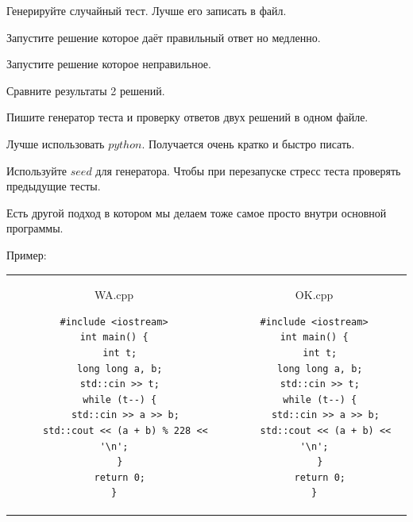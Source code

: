
\up \up
\begin{MyList}[0pt]
	\item Генерируйте случайный тест. Лучше его записать в файл.
	\item Запустите решение которое даёт правильный ответ но медленно.
	\item Запустите решение которое неправильное.
	\item Сравните результаты 2 решений.
\end{MyList} \up \up


\up \up
\begin{MyList}[0pt]
	\item Пишите генератор теста и проверку ответов двух решений в одном файле.
	\item Лучше использовать $python$. Получается очень кратко и быстро писать.
	\item Используйте $seed$ для генератора. Чтобы при перезапуске стресс теста проверять предыдущие тесты. 
\end{MyList} \up \up

Есть другой подход в котором мы делаем тоже самое просто внутри основной программы.

Пример:

\down

\begin{tabular}{cc}
	\begin{minipage}{10cm}
		WA.cpp
		\begin{verbatim}
#include <iostream>
int main() {
  int t;
  long long a, b;
  std::cin >> t;
  while (t--) {
    std::cin >> a >> b;
    std::cout << (a + b) % 228 << '\n';
  }
  return 0;
}
		\end{verbatim}
	\end{minipage} 
	&
	\begin{minipage}{10cm}
		OK.cpp
		\begin{verbatim}
#include <iostream>
int main() {
  int t;
  long long a, b;
  std::cin >> t;
  while (t--) {
    std::cin >> a >> b;
    std::cout << (a + b) << '\n';
  }
  return 0;
}
		\end{verbatim}
	\end{minipage} 
\end{tabular}

